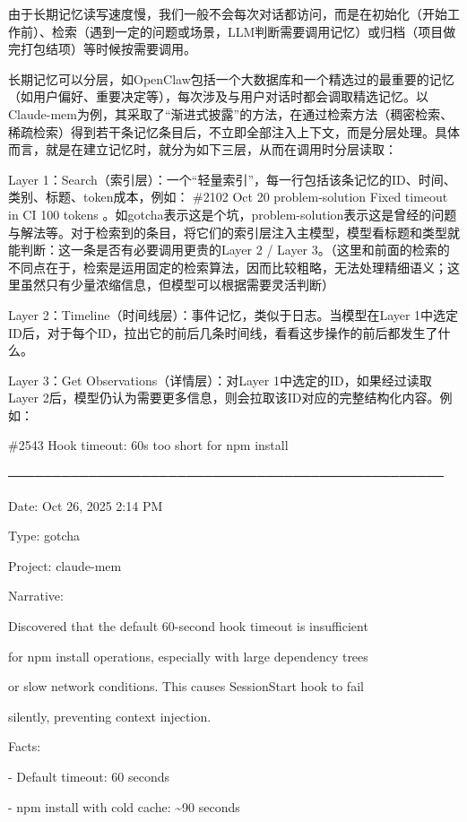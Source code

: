 由于长期记忆读写速度慢，我们一般不会每次对话都访问，而是在初始化（开始工作前）、检索（遇到一定的问题或场景，LLM判断需要调用记忆）或归档（项目做完打包结项）等时候按需要调用。

长期记忆可以分层，如OpenClaw包括一个大数据库和一个精选过的最重要的记忆（如用户偏好、重要决定等），每次涉及与用户对话时都会调取精选记忆。以Claude-mem为例，其采取了``渐进式披露''的方法，在通过检索方法（稠密检索、稀疏检索）得到若干条记忆条目后，不立即全部注入上下文，而是分层处理。具体而言，就是在建立记忆时，就分为如下三层，从而在调用时分层读取：

Layer 1：Search（索引层）：一个``轻量索引''，每一行包括该条记忆的ID、时间、类别、标题、token成本，例如：\textbar{} \#2102\textbar{} Oct 20 \textbar{} problem-solution \textbar{} Fixed timeout in CI \textbar{} 100 tokens \textbar。如gotcha表示这是个坑，problem-solution表示这是曾经的问题与解法等。对于检索到的条目，将它们的索引层注入主模型，模型看标题和类型就能判断：这一条是否有必要调用更贵的Layer 2 / Layer 3。（这里和前面的检索的不同点在于，检索是运用固定的检索算法，因而比较粗略，无法处理精细语义；这里虽然只有少量浓缩信息，但模型可以根据需要灵活判断）

Layer 2：Timeline（时间线层）：事件记忆，类似于日志。当模型在Layer 1中选定ID后，对于每个ID，拉出它的前后几条时间线，看看这步操作的前后都发生了什么。

Layer 3：Get Observations（详情层）：对Layer 1中选定的ID，如果经过读取Layer 2后，模型仍认为需要更多信息，则会拉取该ID对应的完整结构化内容。例如：

\#2543 Hook timeout: 60s too short for npm install

─────────────────────────────────────────────────

Date: Oct 26, 2025 2:14 PM

Type: gotcha

Project: claude-mem

Narrative:

Discovered that the default 60-second hook timeout is insufficient

for npm install operations, especially with large dependency trees

or slow network conditions. This causes SessionStart hook to fail

silently, preventing context injection.

Facts:

- Default timeout: 60 seconds

- npm install with cold cache: \textasciitilde90 seconds

